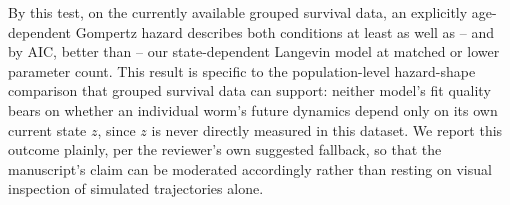 By this test, on the currently available grouped survival data, an
explicitly age-dependent Gompertz hazard describes both conditions at
least as well as -- and by AIC, better than -- our state-dependent
Langevin model at matched or lower parameter count. This result is
specific to the population-level hazard-shape comparison that grouped
survival data can support: neither model's fit quality bears on whether
an individual worm's future dynamics depend only on its own current state
$z$, since $z$ is never directly measured in this dataset. We report this
outcome plainly, per the reviewer's own suggested fallback, so that the
manuscript's claim can be moderated accordingly rather than resting on
visual inspection of simulated trajectories alone.


